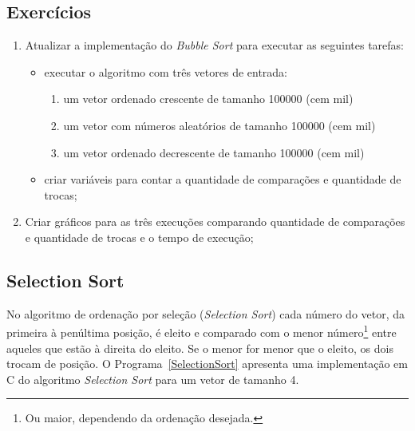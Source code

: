 \documentclass[11pt,fleqn]{book} %
\begin{document}
\subsection*{Exercícios}
\begin{enumerate}
	\item Atualizar a implementação do \textit{Bubble Sort} para executar as seguintes tarefas:
	\begin{itemize}
		\item executar o algoritmo com três vetores de entrada:
		\begin{enumerate}
			\item um vetor ordenado crescente de tamanho 100000 (cem mil)
			\item um vetor com números aleatórios de tamanho 100000 (cem mil)
			\item um vetor ordenado decrescente de tamanho 100000 (cem mil)
		\end{enumerate} 
		\item criar variáveis para contar a quantidade de comparações e quantidade de trocas;
	\end{itemize} 
	\item Criar gráficos para as três execuções comparando quantidade de comparações e quantidade de trocas e o tempo de execução;
\end{enumerate} 

\newpage
\subsection*{Selection Sort}
No algoritmo de ordenação por seleção (\textit{Selection Sort}) cada número do vetor, da primeira à penúltima posição, é eleito e comparado com o menor número\footnote{Ou maior, dependendo da ordenação desejada.} entre aqueles que estão à direita do eleito.
Se o menor for menor que o eleito, os dois trocam de posição.
O Programa~\ref{SelectionSort} apresenta uma implementação em C do algoritmo \textit{Selection Sort} para um vetor de tamanho 4.

\end{document}
